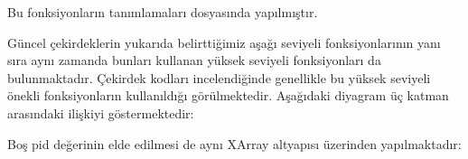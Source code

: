 \documentclass[a4paper,10pt,turkish]{sphinxmanual}
\begin{document}
\begin{sphinxVerbatim}[commandchars=\\\{\}]
\end{sphinxVerbatim}

\sphinxAtStartPar
Bu fonksiyonların tanımlamaları  dosyasında yapılmıştır.

\sphinxAtStartPar
Güncel çekirdeklerin yukarıda belirttiğimiz aşağı seviyeli fonksiyonlarının yanı sıra aynı zamanda
bunları kullanan yüksek seviyeli  fonksiyonları da bulunmaktadır. Çekirdek kodları incelendiğinde
genellikle bu yüksek seviyeli  önekli fonksiyonların kullanıldığı görülmektedir. Aşağıdaki
diyagram üç katman arasındaki ilişkiyi göstermektedir:


\sphinxAtStartPar
Boş pid değerinin elde edilmesi de aynı XArray altyapısı üzerinden yapılmaktadır:

\begin{sphinxVerbatim}[commandchars=\\\{\}]
\end{sphinxVerbatim}
\end{document}
